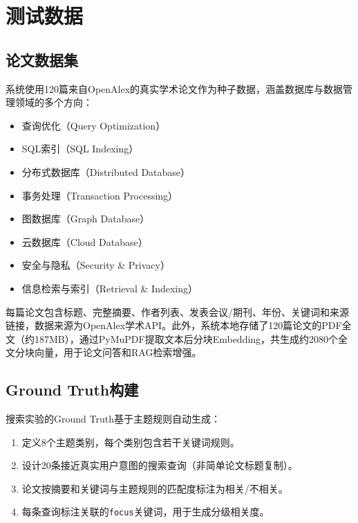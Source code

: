 \documentclass[12pt,a4paper]{ctexart}
\newcommand{\code}[1]{\texttt{#1}}
\begin{document}
\section{测试数据}

\subsection{论文数据集}

系统使用120篇来自OpenAlex的真实学术论文作为种子数据，涵盖数据库与数据管理领域的多个方向：

\begin{itemize}
\item 查询优化（Query Optimization）
\item SQL索引（SQL Indexing）
\item 分布式数据库（Distributed Database）
\item 事务处理（Transaction Processing）
\item 图数据库（Graph Database）
\item 云数据库（Cloud Database）
\item 安全与隐私（Security \& Privacy）
\item 信息检索与索引（Retrieval \& Indexing）
\end{itemize}

每篇论文包含标题、完整摘要、作者列表、发表会议/期刊、年份、关键词和来源链接，数据来源为OpenAlex学术API。此外，系统本地存储了120篇论文的PDF全文（约187MB），通过PyMuPDF提取文本后分块Embedding，共生成约2080个全文分块向量，用于论文问答和RAG检索增强。

\subsection{Ground Truth构建}

搜索实验的Ground Truth基于主题规则自动生成：

\begin{enumerate}
\item 定义8个主题类别，每个类别包含若干关键词规则。
\item 设计20条接近真实用户意图的搜索查询（非简单论文标题复制）。
\item 论文按摘要和关键词与主题规则的匹配度标注为相关/不相关。
\item 每条查询标注关联的\code{focus}关键词，用于生成分级相关度。
\end{enumerate}
\end{document}
